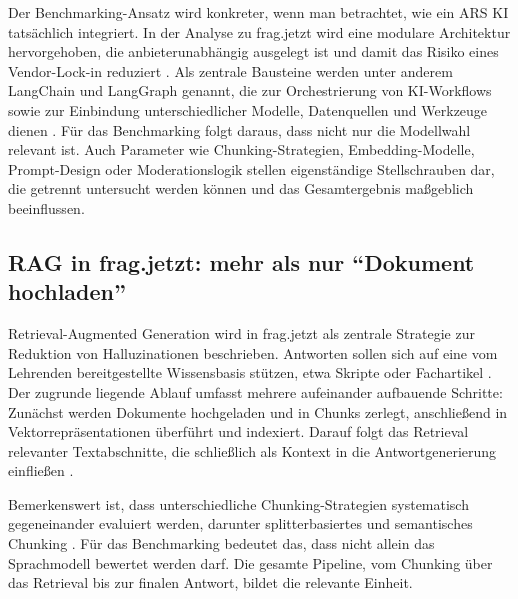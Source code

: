 Der Benchmarking-Ansatz wird konkreter, wenn man betrachtet, wie ein ARS KI tatsächlich integriert. In der Analyse zu frag.jetzt wird eine modulare Architektur hervorgehoben, die anbieterunabhängig ausgelegt ist und damit das Risiko eines Vendor-Lock-in reduziert \parencite{fragjetzt-analyse}. Als zentrale Bausteine werden unter anderem LangChain und LangGraph genannt, die zur Orchestrierung von KI-Workflows sowie zur Einbindung unterschiedlicher Modelle, Datenquellen und Werkzeuge dienen \parencite{fragjetzt-analyse,fragjetzt-handout}. Für das Benchmarking folgt daraus, dass nicht nur die Modellwahl relevant ist. Auch Parameter wie Chunking-Strategien, Embedding-Modelle, Prompt-Design oder Moderationslogik stellen eigenständige Stellschrauben dar, die getrennt untersucht werden können und das Gesamtergebnis maßgeblich beeinflussen.

\subsection{RAG in frag.jetzt: mehr als nur \enquote{Dokument hochladen}}

Retrieval-Augmented Generation wird in frag.jetzt als zentrale Strategie zur Reduktion von Halluzinationen beschrieben. Antworten sollen sich auf eine vom Lehrenden bereitgestellte Wissensbasis stützen, etwa Skripte oder Fachartikel \parencite{fragjetzt-analyse,fragjetzt-handout}. Der zugrunde liegende Ablauf umfasst mehrere aufeinander aufbauende Schritte: Zunächst werden Dokumente hochgeladen und in Chunks zerlegt, anschließend in Vektorrepräsentationen überführt und indexiert. Darauf folgt das Retrieval relevanter Textabschnitte, die schließlich als Kontext in die Antwortgenerierung einfließen \parencite{fragjetzt-analyse}. 

Bemerkenswert ist, dass unterschiedliche Chunking-Strategien systematisch gegeneinander evaluiert werden, darunter splitterbasiertes und semantisches Chunking \parencite{fragjetzt-analyse}. Für das Benchmarking bedeutet das, dass nicht allein das Sprachmodell bewertet werden darf. Die gesamte Pipeline, vom Chunking über das Retrieval bis zur finalen Antwort, bildet die relevante Einheit.


